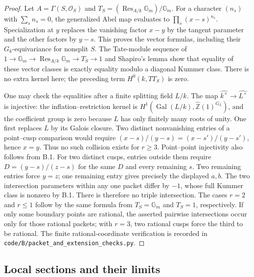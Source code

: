 \documentclass[11pt,oneside]{article}
\begin{document}
\begin{proof}
Let $A=\Gamma(S,\mathcal O_S)$ and
$T_S=(\operatorname{Res}_{A/k}\mathbb G_m)/\mathbb G_m$.
For a character $(n_s)$ with $\sum_s n_s=0$, the generalized Abel map
evaluates to $\prod_s(x-s)^{n_s}$.  Specialization at $y$ replaces the
vanishing factor $x-y$ by the tangent parameter and the other factors
by $y-s$.  This proves the vector formulas, including their
$G_k$-equivariance for nonsplit $S$.
The Tate-module sequence of
$1\to\mathbb G_m\to\operatorname{Res}_{A/k}\mathbb G_m\to T_S\to1$
and Shapiro's lemma show that equality of these vector classes is
exactly equality modulo a diagonal Kummer class.  There is no extra
kernel here; the preceding term $H^0(k,TT_S)$ is zero.

One may check the equalities after a finite splitting field $L/k$.
The map $\widehat{k^\times}\to\widehat{L^\times}$ is injective:
the inflation--restriction kernel is
$H^1(\operatorname{Gal}(L/k),\widehat{\mathbb Z}(1)^{G_L})$,
and the coefficient group is zero because $L$ has only finitely
many roots of unity.  One first replaces $L$ by its Galois closure.
Two distinct nonvanishing entries of a point--cusp comparison would
require
$(x-s)/(y-s)=(x-s')/(y-s')$, hence $x=y$.  Thus no such collision
exists for $r\geq3$.  Point--point injectivity also follows from B.1.
For two distinct cusps, entries outside them require
$D=(y-s)/(z-s)$ for the same $D$ and every remaining $s$.
Two remaining entries force $y=z$; one remaining entry gives precisely
the displayed $a,b$.  The two intersection parameters within any one
packet differ by $-1$, whose full Kummer class is nonzero by B.1.
There is therefore no triple intersection.  The cases $r=2$ and
$r\leq1$ follow by the same formula from $T_S=\mathbb G_m$ and
$T_S=1$, respectively.  If only some boundary points are rational,
the asserted pairwise intersections occur only for those rational
packets; with $r=3$, two rational cusps force the third to be rational.
The finite rational-coordinate verification is recorded in
\texttt{code/B/packet\_and\_extension\_checks.py}.
\end{proof}

\subsection{Local sections and their limits}
\end{document}
